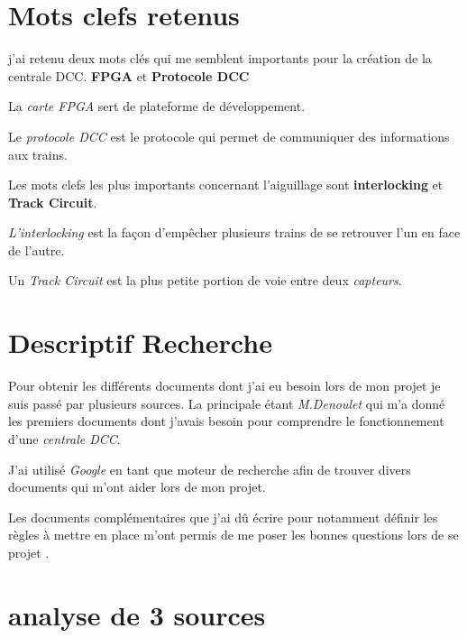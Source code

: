 \section{Mots clefs retenus}
\label{sec:Mots_clefs}

j'ai retenu deux mots clés qui me semblent importants pour la création de la centrale DCC.
\textbf{FPGA} et \textbf{Protocole DCC}

\medskip

La \emph{carte FPGA} sert de plateforme de développement.

Le \emph{protocole DCC} est le protocole qui permet de communiquer des
informations aux trains.

\bigskip

Les mots clefs les plus importants concernant l'aiguillage sont
\textbf{interlocking} et \textbf{Track Circuit}.

\medskip

\emph{L'interlocking} est la façon d'empêcher plusieurs trains de se retrouver l'un en face de l'autre.

Un \emph{Track Circuit} est la plus petite portion de voie entre deux \emph{capteurs}.

\section{Descriptif Recherche}
\label{sec:descriptif}

Pour obtenir les différents documents dont j'ai eu besoin lors de mon
projet je suis passé par plusieurs sources. La principale étant
\emph{M.Denoulet} qui m'a donné les premiers documents \cite{FPGA1} \cite{DCC} \cite{Jouef}   dont j'avais besoin
pour comprendre le fonctionnement d'une \emph{centrale DCC}.

\smallskip

J'ai utilisé \emph{Google} en tant que moteur de recherche afin de
trouver divers documents \cite{Xilink} \cite{IXL} \cite{OCAML}
\cite{VHDL} \cite{siteferro} qui m'ont aider lors de mon projet.

\smallskip

Les documents complémentaires que j'ai dû écrire
pour notamment définir les règles à mettre en place m'ont permis de
me poser les bonnes questions lors de se projet \cite{rapport}.


\section{analyse de 3 sources}
\label{sec:analyse}

